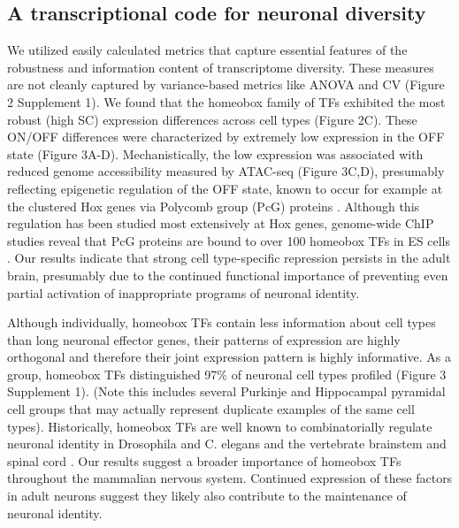 \subsection{A transcriptional code for neuronal diversity}
We utilized easily calculated metrics that capture essential features of the robustness and information content of transcriptome diversity. These measures are not cleanly captured by variance-based metrics like ANOVA and CV (Figure 2 Supplement 1). We found that the homeobox family of TFs exhibited the most robust (high SC) expression differences across cell types (Figure 2C). These ON/OFF differences were characterized by extremely low expression in the OFF state (Figure 3A-D). Mechanistically, the low expression was associated with reduced genome accessibility measured by ATAC-seq (Figure 3C,D), presumably reflecting epigenetic regulation of the OFF state, known to occur for example at the clustered Hox genes via Polycomb group (PcG) proteins \citep{Montavon_2014}. Although this regulation has been studied most extensively at Hox genes, genome-wide ChIP studies reveal that PcG proteins are bound to over 100 homeobox TFs in ES cells \citep{Boyer_2006}. Our results indicate that strong cell type-specific repression persists in the adult brain, presumably due to the continued functional importance of preventing even partial activation of inappropriate programs of neuronal identity. 

Although individually, homeobox TFs contain less information about cell types than long neuronal effector genes, their patterns of expression are highly orthogonal and therefore their joint expression pattern is highly informative. As a group, homeobox TFs distinguished 97\% of neuronal cell types profiled (Figure 3 Supplement 1). (Note this includes several Purkinje and Hippocampal pyramidal cell groups that may actually represent duplicate examples of the same cell types). Historically, homeobox TFs are well known to combinatorially regulate neuronal identity in Drosophila and C. elegans \citep{Kratsios_2017} and the vertebrate brainstem and spinal cord \citep{Dasen_2009,Philippidou_2013}. Our results suggest a broader importance of homeobox TFs throughout the mammalian nervous system. Continued expression of these factors in adult neurons suggest they likely also contribute to the maintenance of neuronal identity.


